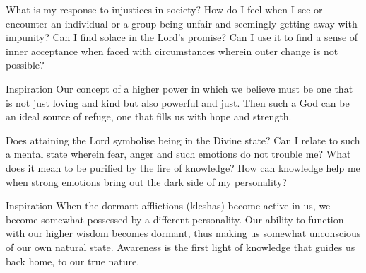\newpage
\begin{mananam}{} 
\mananamtext What is my response to injustices in society? How do I feel when I see or encounter an individual or a group being unfair and seemingly getting away with impunity? Can I find solace in the Lord’s promise? Can I use it to find a sense of inner acceptance when faced with circumstances wherein outer change is not possible?
\end{mananam}
\WritingHand{}
\begin{inspiration}{\mananamfont Inspiration}
\mananamtext Our concept of a higher power in which we believe must be one that is not just loving and kind but also powerful and just. Then such a God can be an ideal source of refuge, one that fills us with hope and strength.
\end{inspiration}
\newpage


\newpage
\begin{mananam}{} 
\mananamtext Does attaining the Lord symbolise being in the Divine state? Can I relate to such a mental state wherein fear, anger and such emotions do not trouble me?
What does it mean to be purified by the fire of knowledge? How can knowledge help me when strong emotions bring out the dark side of my personality?
\end{mananam}
\WritingHand{}
\begin{inspiration}{\mananamfont Inspiration}
\mananamtext When the dormant afflictions (kleshas) become active in us, we become somewhat possessed by a different personality. Our ability to function with our higher wisdom becomes dormant, thus making us somewhat unconscious of our own natural state. Awareness is the first light of knowledge that guides us back home, to our true nature. 
\end{inspiration}
\newpage


